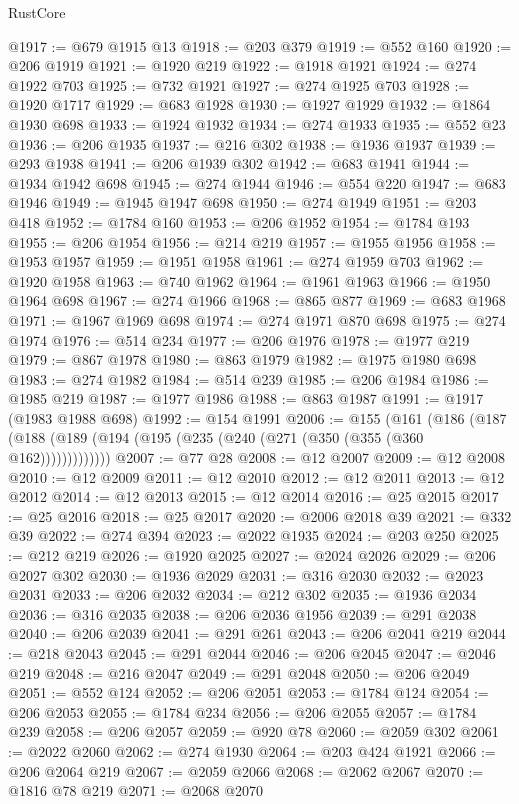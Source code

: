 \begin{lexlean}{RustCore}
\begin{coremodule}
@1917 := @679 @1915 @13
@1918 := @203 @379
@1919 := @552 @160
@1920 := @206 @1919
@1921 := @1920 @219
@1922 := @1918 @1921
@1924 := @274 @1922 @703
@1925 := @732 @1921
@1927 := @274 @1925 @703
@1928 := @1920 @1717
@1929 := @683 @1928
@1930 := @1927 @1929
@1932 := @1864 @1930 @698
@1933 := @1924 @1932
@1934 := @274 @1933
@1935 := @552 @23
@1936 := @206 @1935
@1937 := @216 @302
@1938 := @1936 @1937
@1939 := @293 @1938
@1941 := @206 @1939 @302
@1942 := @683 @1941
@1944 := @1934 @1942 @698
@1945 := @274 @1944
@1946 := @554 @220
@1947 := @683 @1946
@1949 := @1945 @1947 @698
@1950 := @274 @1949
@1951 := @203 @418
@1952 := @1784 @160
@1953 := @206 @1952
@1954 := @1784 @193
@1955 := @206 @1954
@1956 := @214 @219
@1957 := @1955 @1956
@1958 := @1953 @1957
@1959 := @1951 @1958
@1961 := @274 @1959 @703
@1962 := @1920 @1958
@1963 := @740 @1962
@1964 := @1961 @1963
@1966 := @1950 @1964 @698
@1967 := @274 @1966
@1968 := @865 @877
@1969 := @683 @1968
@1971 := @1967 @1969 @698
@1974 := @274 @1971 @870 @698
@1975 := @274 @1974
@1976 := @514 @234
@1977 := @206 @1976
@1978 := @1977 @219
@1979 := @867 @1978
@1980 := @863 @1979
@1982 := @1975 @1980 @698
@1983 := @274 @1982
@1984 := @514 @239
@1985 := @206 @1984
@1986 := @1985 @219
@1987 := @1977 @1986
@1988 := @863 @1987
@1991 := @1917 (@1983 @1988 @698)
@1992 := @154 @1991
@2006 := @155
    (@161 (@186 (@187 (@188 (@189 (@194 (@195 (@235 (@240 (@271 (@350 (@355 (@360 @162)))))))))))))
@2007 := @77 @28
@2008 := @12 @2007
@2009 := @12 @2008
@2010 := @12 @2009
@2011 := @12 @2010
@2012 := @12 @2011
@2013 := @12 @2012
@2014 := @12 @2013
@2015 := @12 @2014
@2016 := @25 @2015
@2017 := @25 @2016
@2018 := @25 @2017
@2020 := @2006 @2018 @39
@2021 := @332 @39
@2022 := @274 @394
@2023 := @2022 @1935
@2024 := @203 @250
@2025 := @212 @219
@2026 := @1920 @2025
@2027 := @2024 @2026
@2029 := @206 @2027 @302
@2030 := @1936 @2029
@2031 := @316 @2030
@2032 := @2023 @2031
@2033 := @206 @2032
@2034 := @212 @302
@2035 := @1936 @2034
@2036 := @316 @2035
@2038 := @206 @2036 @1956
@2039 := @291 @2038
@2040 := @206 @2039
@2041 := @291 @261
@2043 := @206 @2041 @219
@2044 := @218 @2043
@2045 := @291 @2044
@2046 := @206 @2045
@2047 := @2046 @219
@2048 := @216 @2047
@2049 := @291 @2048
@2050 := @206 @2049
@2051 := @552 @124
@2052 := @206 @2051
@2053 := @1784 @124
@2054 := @206 @2053
@2055 := @1784 @234
@2056 := @206 @2055
@2057 := @1784 @239
@2058 := @206 @2057
@2059 := @920 @78
@2060 := @2059 @302
@2061 := @2022 @2060
@2062 := @274 @1930
@2064 := @203 @424 @1921
@2066 := @206 @2064 @219
@2067 := @2059 @2066
@2068 := @2062 @2067
@2070 := @1816 @78 @219
@2071 := @2068 @2070

\end{coremodule}
\end{lexlean}
